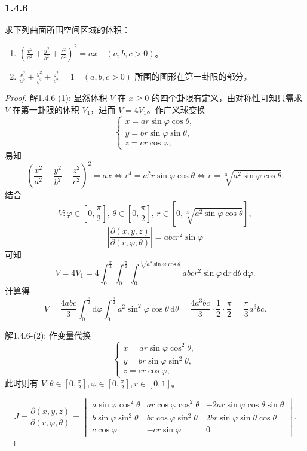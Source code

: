 \documentclass[12pt]{ctexart}
\begin{document}
\subsubsection*{1.4.6}
求下列曲面所围空间区域的体积：
\begin{enumerate}
    \item $\left( \frac{x^2}{a^2} + \frac{y^2}{b^2} + \frac{z^2}{c^2} \right)^2 = ax \quad (a, b, c > 0)$。
    \item $\frac{x^2}{a^2} + \frac{y^2}{b^2} + \frac{z^2}{c^2} = 1 \quad (a, b, c > 0)$ 所围的图形在第一卦限的部分。
\end{enumerate}

\begin{proof}
	解1.4.6-(1): 显然体积 $V$ 在 $x \geq 0$ 的四个卦限有定义，由对称性可知只需求 $V$ 在第一卦限的体积 $V_1$，进而 $V = 4V_1$。作广义球变换
\[
\begin{cases}
x = ar \sin\varphi \cos\theta, \\
y = br \sin\varphi \sin\theta, \\
z = cr \cos\varphi,
\end{cases}
\]
易知
\[
\left( \frac{x^2}{a^2} + \frac{y^2}{b^2} + \frac{z^2}{c^2} \right)^2 = ax \iff r^4 = a^2 r \sin\varphi \cos\theta \iff r = \sqrt[3]{a^2 \sin\varphi \cos\theta}.
\]
结合
\[
V: \varphi \in \left[ 0, \frac{\pi}{2} \right], \, \theta \in \left[ 0, \frac{\pi}{2} \right], \, r \in \left[ 0, \sqrt[3]{a^2 \sin\varphi \cos\theta} \right],
\]
\[
\left| \frac{\partial(x, y, z)}{\partial(r, \varphi, \theta)} \right| = abcr^2 \sin\varphi
\]
可知
\[
V = 4V_1 = 4 \int_{0}^{\frac{\pi}{2}} \int_{0}^{\frac{\pi}{2}} \int_{0}^{\sqrt[3]{a^2 \sin\varphi \cos\theta}} abcr^2 \sin\varphi \, \mathrm{d}r \, \mathrm{d}\theta \, \mathrm{d}\varphi.
\]
计算得
\[
V = \frac{4abc}{3} \int_{0}^{\frac{\pi}{2}} \mathrm{d}\varphi \int_{0}^{\frac{\pi}{2}} a^2 \sin^2\varphi \cos\theta \, \mathrm{d}\theta 
= \frac{4a^3bc}{3} \cdot \frac{1}{2} \cdot \frac{\pi}{2}
= \frac{\pi}{3} a^3bc.
\]

解1.4.6-(2): 作变量代换
\[
\begin{cases}
x = ar \sin\varphi \cos^2\theta, \\
y = br \sin\varphi \sin^2\theta, \\
z = cr \cos\varphi,
\end{cases}
\]
此时则有 $V: \theta \in \left[ 0, \frac{\pi}{2} \right], \varphi \in \left[ 0, \frac{\pi}{2} \right], r \in [0, 1]$。

\[
J = \frac{\partial(x, y, z)}{\partial(r, \varphi, \theta)} =
\begin{vmatrix}
a \sin\varphi \cos^2\theta & ar \cos\varphi \cos^2\theta & -2ar \sin\varphi \cos\theta \sin\theta \\
b \sin\varphi \sin^2\theta & br \cos\varphi \sin^2\theta & 2br \sin\varphi \sin\theta \cos\theta \\
c \cos\varphi & -cr \sin\varphi & 0
\end{vmatrix}.
\]


\end{proof}
\end{document}
